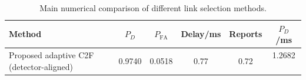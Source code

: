 \begin{table}[t]
    \centering
    \caption{Main numerical comparison of different link selection methods.}
    \label{tab:main_summary}
    \begin{tabular}{l c c c c c}
        \hline
        Method & $P_D$ & $P_{\mathrm{FA}}$ & Delay/ms & Reports & $P_D$/ms \\
        \hline
        Proposed adaptive C2F (detector-aligned) & 0.9740 & 0.0518 & 0.77 & 0.72 & 1.2682 \
        \hline
    \end{tabular}
\end{table}
